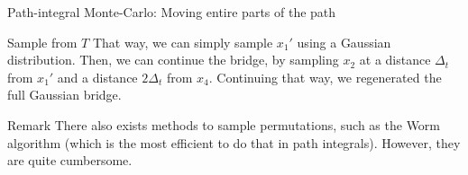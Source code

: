 \documentclass[a4paper]{article}
\begin{document}
\begin{parag}{Path-integral Monte-Carlo: Moving entire parts of the path}
\begin{subparag}{Sample from $T$}
        That way, we can simply sample $x_1'$ using a Gaussian distribution. Then, we can continue the bridge, by sampling $x_2$ at a distance $\Delta_t$ from $x_1'$ and a distance $2\Delta_t$ from $x_4$. Continuing that way, we regenerated the full Gaussian bridge.
    \end{subparag}
\end{parag}

\begin{parag}{Remark}
    There also exists methods to sample permutations, such as the Worm algorithm (which is the most efficient to do that in path integrals). However, they are quite cumbersome.
\end{parag}
\end{document}
